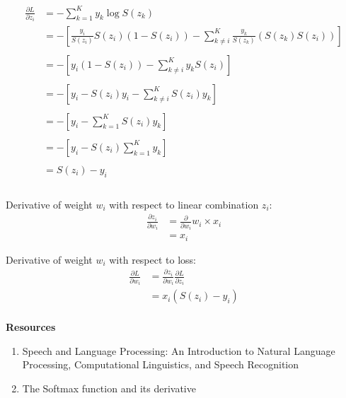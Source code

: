 \begin{align*}
    \frac{\partial L}{\partial z_i} &= - \sum^{K}_{k=1} y_k \log S(z_k) \\
    &= - \left[ \frac{y_i}{S(z_i)}S(z_i)(1 - S(z_i)) - \sum^{K}_{k\neq i} \frac{y_k}{S(z_k)}(S(z_k)S(z_i))  \right]\\\\
    &= - \left[ y_i(1 - S(z_i)) - \sum^{K}_{k\neq i} y_k S(z_i) \right]\\\\
    &= - \left[ y_i - S(z_i) y_i  - \sum^{K}_{k\neq i} S(z_i) y_k  \right]\\\\
    &= - \left[ y_i - \sum^{K}_{k=1}  S(z_i) y_k \right]\\\\
    &= - \left[ y_i - S(z_i) \sum^{K}_{k=1}  y_k \right]\\\\
    &= S(z_i) - y_i\\\\
\end{align*}

Derivative of weight $w_i$ with respect to linear combination $z_i$:\\

\begin{align*}
    \frac{\partial z_i}{\partial w_i} &= \frac{\partial}{\partial w_i} w_i \times x_i\\
    &= x_i
\end{align*}

Derivative of weight $w_i$ with respect to loss:\\

\begin{align*}
    \frac{\partial L}{\partial w_i} &= \frac{\partial z_i}{\partial w_i}\frac{\partial L}{\partial z_i}\\
    &= x_i (S(z_i) - y_i)\\
\end{align*}

\textbf{Resources}
\begin{enumerate}
    \item Speech and Language Processing: An Introduction to Natural Language Processing, Computational Linguistics, and Speech Recognition~\cite{jurafsky1}
    \item The Softmax function and its derivative~\cite{bendersky1}
\end{enumerate}
